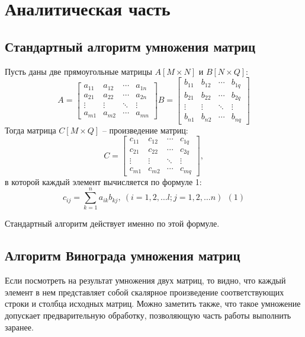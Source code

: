 \chapter{Аналитическая часть}

\section{Стандартный алгоритм умножения матриц}

Пусть даны две прямоугольные матрицы $A[M \times N]$ и $B[N \times Q]$:
$$
A = 
\begin{bmatrix} 
	a_{11} & a_{12} & \cdots & a_{1n} \\
	a_{21} & a_{22} & \cdots & a_{2n} \\ 
	\vdots & \vdots & \ddots & \vdots \\ 
	a_{m1} & a_{m2} & \cdots & a_{mn}
\end{bmatrix}
B =   
\begin{bmatrix} 
	b_{11} & b_{12} & \cdots & b_{1q} \\
	b_{21} & b_{22} & \cdots & b_{2q} \\ 
	\vdots & \vdots & \ddots & \vdots \\ 
	b_{n1} & b_{n2} & \cdots & b_{nq}
\end{bmatrix}
$$
Тогда матрица $C[M \times Q]$ -- произведение матриц:
$$
C = 
\begin{bmatrix} 
	c_{11} & c_{12} & \cdots & c_{1q} \\
	c_{21} & c_{22} & \cdots & c_{2q} \\ 
	\vdots & \vdots & \ddots & \vdots \\ 
	c_{m1} & c_{m2} & \cdots & c_{mq}
\end{bmatrix},
$$
в которой каждый элемент вычисляется по формуле 1: 
$$c_{ij} = \sum_{k=1}^n a_{ik}b_{kj}, ~(i=1, 2, \ldots l;j=1, 2, \ldots n)~~(1)$$

Стандартный алгоритм действует именно по этой формуле.


\section{Алгоритм Винограда умножения матриц}

Если посмотреть на результат умножения двух матриц, то видно, что каждый элемент в нем представляет собой скалярное произведение соответствующих строки и столбца исходных матриц.
Можно заметить также, что такое умножение допускает предварительную обработку, позволяющую часть работы выполнить заранее.

